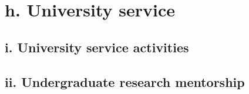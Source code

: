 \documentclass{article}
\begin{document}



\section*{h. University service}

\subsection*{i. University service activities}



\subsection*{ii. Undergraduate research mentorship}


\end{document}
